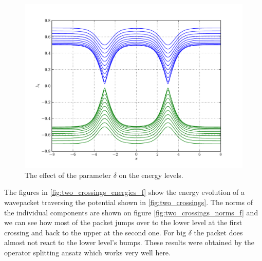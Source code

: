 \begin{figure}
  \centering
  \includegraphics[width=0.8\linewidth]{./plot/two_crossings/potential_eigenvalues_multi2.pdf}
  \caption{The effect of the parameter $\delta$ on the energy levels.}
  \label{fig:two_crossings_multi}
\end{figure}

The figures in \ref{fig:two_crossings_energies_f} show the energy evolution of a wavepacket
traversing the potential shown in \ref{fig:two_crossings}. The norms of the individual
components are shown on figure \ref{fig:two_crossings_norms_f} and we can see how most of the
packet jumps over to the lower level at the first crossing and back to the upper at
the second one. For big $\delta$ the packet does almost not react to the lower level's bumps.
These results were obtained by the operator splitting ansatz which works very well here.

